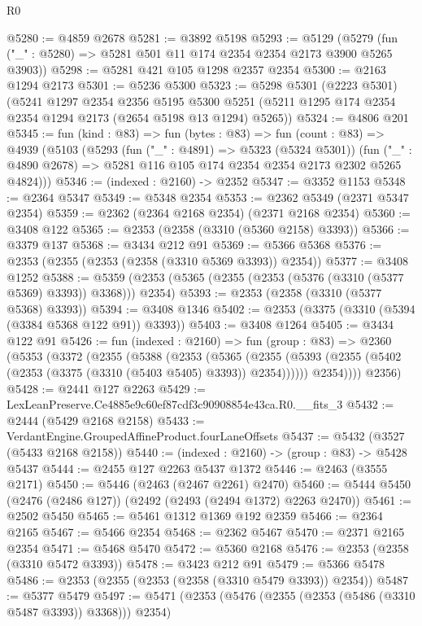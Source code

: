 \begin{lexlean}{R0}
\begin{coremodule}
@5280 := @4859 @2678
@5281 := @3892 @5198
@5293 := @5129
    (@5279 (fun ("_" : @5280) => @5281 @501 @11 @174 @2354 @2354 @2173 @3900 @5265 @3903))
@5298 := @5281 @421 @105 @1298 @2357 @2354
@5300 := @2163 @1294 @2173
@5301 := @5236 @5300
@5323 := @5298
    @5301
    (@2223 @5301)
    (@5241
      @1297
      @2354
      @2356
      @5195
      @5300
      @5251
      (@5211 @1295 @174 @2354 @2354 @1294 @2173 (@2654 @5198 @13 @1294) @5265))
@5324 := @4806 @201
@5345 := fun (kind : @83) =>
  fun (bytes : @83) =>
  fun (count : @83) =>
  @4939
    (@5103
      (@5293
        (fun ("_" : @4891) => @5323 (@5324 @5301))
        (fun ("_" : @4890 @2678) => @5281 @116 @105 @174 @2354 @2354 @2173 @2302 @5265 @4824)))
@5346 := (indexed : @2160) -> @2352
@5347 := @3352 @1153
@5348 := @2364 @5347
@5349 := @5348 @2354
@5353 := @2362 @5349 (@2371 @5347 @2354)
@5359 := @2362 (@2364 @2168 @2354) (@2371 @2168 @2354)
@5360 := @3408 @122
@5365 := @2353 (@2358 (@3310 (@5360 @2158) @3393))
@5366 := @3379 @137
@5368 := @3434 @212 @91
@5369 := @5366 @5368
@5376 := @2353 (@2355 (@2353 (@2358 (@3310 @5369 @3393)) @2354))
@5377 := @3408 @1252
@5388 := @5359 (@2353 (@5365 (@2355 (@2353 (@5376 (@3310 (@5377 @5369) @3393)) @3368))) @2354)
@5393 := @2353 (@2358 (@3310 (@5377 @5368) @3393))
@5394 := @3408 @1346
@5402 := @2353 (@3375 (@3310 (@5394 (@3384 @5368 @122 @91)) @3393))
@5403 := @3408 @1264
@5405 := @3434 @122 @91
@5426 := fun (indexed : @2160) =>
  fun (group : @83) =>
  @2360
    (@5353
      (@3372
        (@2355
          (@5388
            (@2353
              (@5365
                (@2355 (@5393 (@2355 (@5402 (@2353 (@3375 (@3310 (@5403 @5405) @3393)) @2354))))))
              @2354))))
      @2356)
@5428 := @2441 @127 @2263
@5429 := LexLeanPreserve.Ce4885e9c60ef87cdf3c90908854e43ca.R0.__fits_3
@5432 := @2444 (@5429 @2168 @2158)
@5433 := VerdantEngine.GroupedAffineProduct.fourLaneOffsets
@5437 := @5432 (@3527 (@5433 @2168 @2158))
@5440 := (indexed : @2160) -> (group : @83) -> @5428 @5437
@5444 := @2455 @127 @2263 @5437 @1372
@5446 := @2463 (@3555 @2171)
@5450 := @5446 (@2463 (@2467 @2261) @2470)
@5460 := @5444 @5450 (@2476 (@2486 @127)) (@2492 (@2493 (@2494 @1372) @2263 @2470))
@5461 := @2502 @5450
@5465 := @5461 @1312 @1369 @192 @2359
@5466 := @2364 @2165
@5467 := @5466 @2354
@5468 := @2362 @5467
@5470 := @2371 @2165 @2354
@5471 := @5468 @5470
@5472 := @5360 @2168
@5476 := @2353 (@2358 (@3310 @5472 @3393))
@5478 := @3423 @212 @91
@5479 := @5366 @5478
@5486 := @2353 (@2355 (@2353 (@2358 (@3310 @5479 @3393)) @2354))
@5487 := @5377 @5479
@5497 := @5471 (@2353 (@5476 (@2355 (@2353 (@5486 (@3310 @5487 @3393)) @3368))) @2354)

\end{coremodule}
\end{lexlean}
